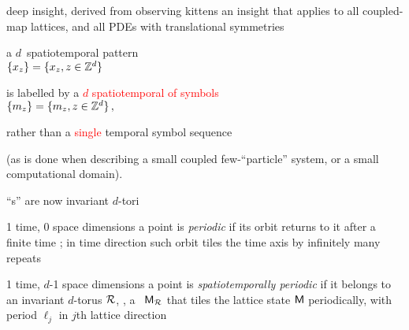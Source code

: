 \begin{frame}{deep insight, derived from observing kittens}
an insight that applies
to all coupled-map lattices, and all PDEs with translational symmetries

\bigskip

a $d$\dmn\ spatiotemporal pattern\\
\(
\{x_{z}\} = \{x_{z},  z\in \mathbb{Z}^{d}  \}
\)

\bigskip

is labelled by a \textcolor{red}{{\em $d$\dmn} spatiotemporal {\brick} of symbols}\\
\(
\{m_{z}\} = \{m_{z}, z\in \mathbb{Z}^{d}\}
\,,
\)

\vfill

rather than a \textcolor{red}{single} temporal symbol sequence


\bigskip

(as is done
when describing a small coupled few-``particle'' system, or a small
computational domain).
\end{frame}


\begin{frame}{``\po s'' are now invariant $d$-tori}


\begin{block}{1 time, 0 space dimensions}
a {\statesp} point is {\em periodic} if its orbit returns to it
after a finite time \period{}; in time direction such orbit tiles the time axis
by infinitely many repeats
\end{block}

\bigskip

\begin{block}{1 time, $d$-1 space dimensions}
 a {\statesp} point is {\em spatiotemporally periodic} if
it belongs to an invariant $d$-torus ${\mathcal{R}}$, \ie, a \brick\ $\mathsf{M}_{\mathcal{R}}$ that
tiles the lattice state  $\mathsf{M}$ periodically, with period $\ell_j$ in
$j$th lattice direction
\end{block}
\end{frame}

